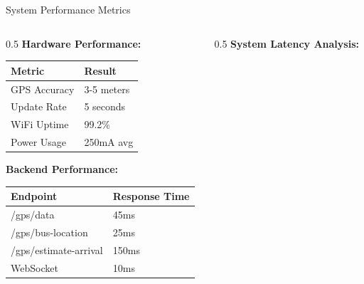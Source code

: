 \documentclass[aspectratio=169]{beamer}
\begin{document}
\begin{frame}{System Performance Metrics}
    \begin{columns}
        \begin{column}{0.5\textwidth}
            \textbf{Hardware Performance:}
            \begin{center}
                \footnotesize
                \begin{tabular}{|l|l|}
                    \hline
                    \textbf{Metric} & \textbf{Result} \\
                    \hline
                    GPS Accuracy & 3-5 meters \\
                    Update Rate & 5 seconds \\
                    WiFi Uptime & 99.2\% \\
                    Power Usage & 250mA avg \\
                    \hline
                \end{tabular}
            \end{center}
            
            \vspace{0.3cm}
            \textbf{Backend Performance:}
            \begin{center}
                \footnotesize
                \begin{tabular}{|l|l|}
                    \hline
                    \textbf{Endpoint} & \textbf{Response Time} \\
                    \hline
                    /gps/data & 45ms \\
                    /gps/bus-location & 25ms \\
                    /gps/estimate-arrival & 150ms \\
                    WebSocket & 10ms \\
                    \hline
                \end{tabular}
            \end{center}
        \end{column}
        \begin{column}{0.5\textwidth}
            \textbf{System Latency Analysis:}
\end{column}
\end{columns}
\end{frame}
\end{document}
